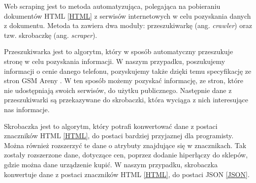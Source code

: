 Web scraping \cite{web_scraping} jest to metoda automatyzująca, polegająca na pobieraniu dokumentów HTML \ref{HTML} z serwisów internetowych w celu pozyskania danych z dokumentu. Metoda ta zawiera dwa moduły: przeszukiwarkę (ang. \textit{crawler}) oraz tzw. skrobaczkę (ang. \textit{scraper}).

Przeszukiwarka jest to algorytm, który w sposób automatyczny przeszukuje stronę w celu pozyskania informacji. W naszym przypadku, poszukujemy informacji o cenie danego telefonu, pozyskujemy także dzięki temu specyfikację ze stron GSM Areny \cite{gsm_arena}. W ten sposób możemy pozyskać informację, ze stron, które nie udostępniają swoich serwisów, do użytku publicznego. Następnie dane z przeszukiwarki są przekazywane do skrobaczki, która wyciąga z nich interesujące nas informacje.

Skrobaczka jest to algorytm, który potrafi konwertować dane z postaci znaczników HTML \ref{HTML}, do postaci bardziej przyjaznej dla programisty. Można również rozszerzyć te dane o atrybuty znajdujące się w znacznikach. Tak zostały rozszerzone dane, dotyczące cen, poprzez dodanie hiperłączy do sklepów, gdzie można dane urządzenie kupić. W naszym przypadku, skrobaczka konwertuje dane z postaci znaczników HTML \ref{HTML}, do postaci JSON \ref{JSON}.
